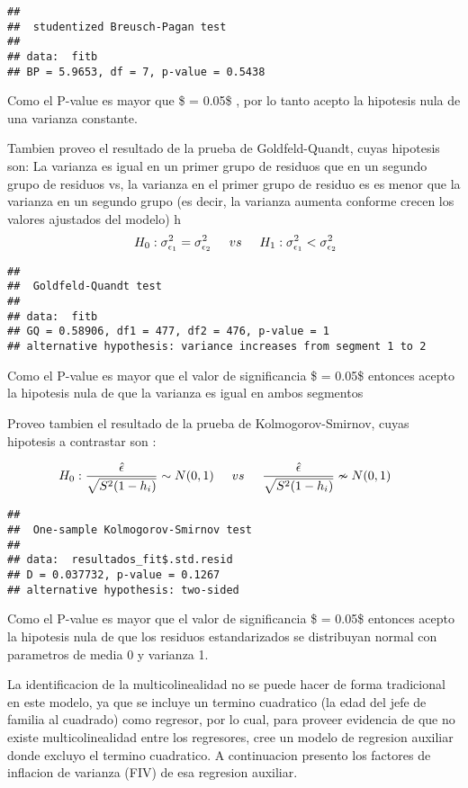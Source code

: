 \documentclass[]{book}
\begin{document}
\begin{verbatim}
## 
##  studentized Breusch-Pagan test
## 
## data:  fitb
## BP = 5.9653, df = 7, p-value = 0.5438
\end{verbatim}

Como el P-value es mayor que \$ \alpha = 0.05\$ , por lo tanto acepto la
hipotesis nula de una varianza constante.

Tambien proveo el resultado de la prueba de Goldfeld-Quandt, cuyas
hipotesis son: La varianza es igual en un primer grupo de residuos que
en un segundo grupo de residuos vs, la varianza en el primer grupo de
residuo es es menor que la varianza en un segundo grupo (es decir, la
varianza aumenta conforme crecen los valores ajustados del modelo) h
\[ \ H_{0}: \sigma_{\epsilon_{1}}^{2} = \sigma_{\epsilon_{2}}^{2} \hspace{0.5cm} vs   \hspace{0.5cm} H_{1}: \sigma_{\epsilon_{1}}^{2} < \sigma_{\epsilon_{2}}^{2}\]

\begin{verbatim}
## 
##  Goldfeld-Quandt test
## 
## data:  fitb
## GQ = 0.58906, df1 = 477, df2 = 476, p-value = 1
## alternative hypothesis: variance increases from segment 1 to 2
\end{verbatim}

Como el P-value es mayor que el valor de significancia \$ \alpha =
0.05\$ entonces acepto la hipotesis nula de que la varianza es igual en
ambos segmentos

Proveo tambien el resultado de la prueba de Kolmogorov-Smirnov, cuyas
hipotesis a contrastar son :

\[ H_{0}: \frac{\hat{\epsilon}}{\sqrt{S^{2}(1-h_{i})}} \sim N(0,1) \hspace{0.5cm} vs \hspace{0.5cm} \frac{\hat{\epsilon}}{\sqrt{S^{2}(1-h_{i})}} \nsim N(0,1) \hspace{0.5cm}  \]

\begin{verbatim}
## 
##  One-sample Kolmogorov-Smirnov test
## 
## data:  resultados_fit$.std.resid
## D = 0.037732, p-value = 0.1267
## alternative hypothesis: two-sided
\end{verbatim}

Como el P-value es mayor que el valor de significancia \$ \alpha =
0.05\$ entonces acepto la hipotesis nula de que los residuos
estandarizados se distribuyan normal con parametros de media 0 y
varianza 1.

La identificacion de la multicolinealidad no se puede hacer de forma
tradicional en este modelo, ya que se incluye un termino cuadratico (la
edad del jefe de familia al cuadrado) como regresor, por lo cual, para
proveer evidencia de que no existe multicolinealidad entre los
regresores, cree un modelo de regresion auxiliar donde excluyo el
termino cuadratico. A continuacion presento los factores de inflacion de
varianza (FIV) de esa regresion auxiliar.
\end{document}
